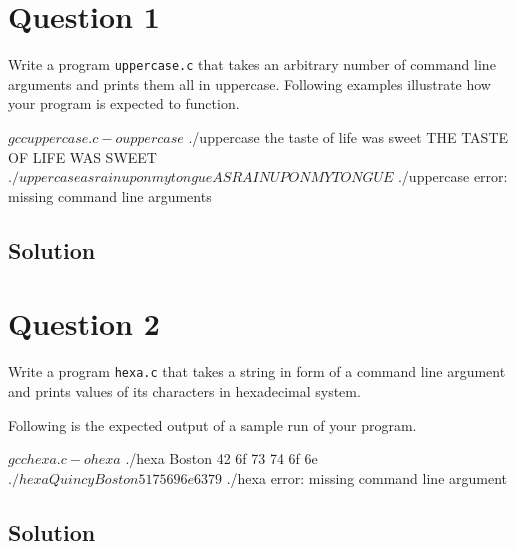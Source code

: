 \documentclass[12pt,letterpaper,twoside]{article}
\begin{document}


\section*{Question 1}

Write a program \texttt{uppercase.c} that takes an arbitrary number of command line arguments and prints them all in uppercase.
Following examples illustrate how your program is expected to function.

\begin{terminal}
$ gcc uppercase.c -o uppercase
$ ./uppercase the taste of life was sweet
THE TASTE OF LIFE WAS SWEET
$ ./uppercase as rain upon my tongue
AS RAIN UPON MY TONGUE
$ ./uppercase
error: missing command line arguments
\end{terminal}

\subsection*{Solution}

\lstset{language=c,tabsize=4}


\section*{Question 2}

Write a program \texttt{hexa.c} that takes a string in form of a command line argument and prints values of its characters in hexadecimal system.

Following is the expected output of a sample run of your program.

\begin{terminal}
$ gcc hexa.c -o hexa
$ ./hexa Boston
42 6f 73 74 6f 6e
$ ./hexa Quincy Boston
51 75 69 6e 63 79
$ ./hexa
error: missing command line argument
\end{terminal}

\subsection*{Solution}

\lstset{language=c,tabsize=4}

\end{document}
